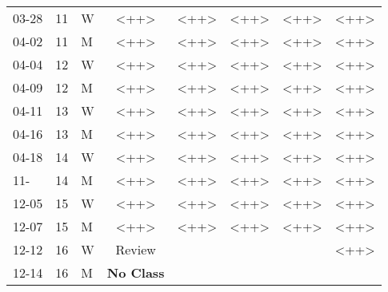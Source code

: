\documentclass[11pt, a4paper]{article}
\begin{document}
\begin{table}[h]
\begin{center}
\begin{tabular}{lllcllll}
03-28 & 11 & W & <++> & <++> & <++> & <++> & <++>\\
04-02 & 11 & M & <++> & <++> & <++> & <++> & <++>\\
04-04 & 12 & W & <++> & <++> & <++> & <++> & <++>\\
04-09 & 12 & M & <++> & <++> & <++> & <++> & <++>\\
04-11 & 13 & W & <++> & <++> & <++> & <++> & <++>\\
04-16 & 13 & M & <++> & <++> & <++> & <++> & <++>\\
04-18 & 14 & W & <++> & <++> & <++> & <++> & <++>\\
11- & 14 & M & <++> & <++> & <++> & <++> & <++>\\
12-05 & 15 & W & <++> & <++> & <++> & <++> & <++>\\
12-07 & 15 & M & <++> & <++> & <++> & <++> & <++>\\
12-12 & 16 & W & Review &  &  &  & <++>\\
12-14 & 16 & M & \textbf{No Class} &  &  &  & \\
\end{tabular}
\end{center}
\end{table}
\end{document}
